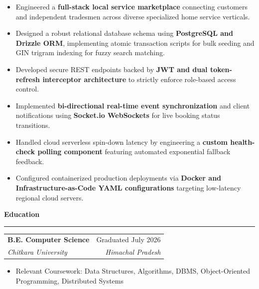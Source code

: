 \documentclass[10pt, letterpaper]{article}
\makeatletter
\newcommand{\resumesection}[1]{
\vspace{6pt}
{\normalsize \textbf{\textcolor{accent}{#1}}}
\vspace{2pt}
\hrule
\vspace{3pt}
}
\newcommand{\experience}[4]{
\begin{tabularx}
	{\textwidth}{@{} X r @{}} \textbf{#1} & #2 \\ \textit{#3} & \textit{#4} \\
\end{tabularx}
\vspace{-2pt}
}
\makeatother
\begin{document}
	\begin{itemize}
		\item Engineered a \textbf{full-stack local service marketplace} connecting
			customers and independent tradesmen across diverse specialized home
			service verticals.

		\item Designed a robust relational database schema using \textbf{PostgreSQL
			and Drizzle ORM}, implementing atomic transaction scripts for bulk seeding
			and GIN trigram indexing for fuzzy search matching.

		\item Developed secure REST endpoints backed by \textbf{JWT and dual token-refresh
			interceptor architecture} to strictly enforce role-based access control.

		\item Implemented \textbf{bi-directional real-time event synchronization}
			and client notifications using \textbf{Socket.io WebSockets} for live booking
			status transitions.

		\item Handled cloud serverless spin-down latency by engineering a \textbf{custom
			health-check polling component} featuring automated exponential fallback
			feedback.

		\item Configured containerized production deployments via \textbf{Docker and
			Infrastructure-as-Code YAML configurations} targeting low-latency regional
			cloud servers.
	\end{itemize}

	\resumesection{Education}

	\experience{B.E. Computer Science}{Graduated July 2026} {Chitkara University}{Himachal Pradesh}

	\vspace{-4pt}
	\begin{itemize}
		\item Relevant Coursework: Data Structures, Algorithms, DBMS, Object-Oriented
			Programming, Distributed Systems
	\end{itemize}
\end{document}
